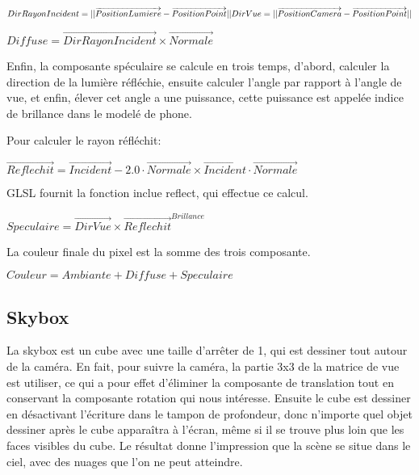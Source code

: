 \documentclass[11pt, a4paper, titlepage]{article}
\begin{document}
\begin{math}
DirRayonIncident = ||\overrightarrow{PositionLumiere} -  \overrightarrow{PositionPoint}||\\
DirVue = ||\overrightarrow{PositionCamera} -  \overrightarrow{PositionPoint}||
\end{math}

\begin{math}
Diffuse = \overrightarrow{DirRayonIncident} \times  \overrightarrow{Normale}
\end{math}

Enfin, la composante spéculaire se calcule en trois temps, d'abord, calculer
la direction de la lumière réfléchie, ensuite calculer l'angle par rapport à 
l'angle de vue, et enfin, élever cet angle a une puissance, cette puissance
est appelée indice de brillance dans le modelé de phone.

Pour calculer le rayon réfléchit:

\begin{math}
\overrightarrow{Reflechit} = \overrightarrow{Incident} - 2.0 \cdot \overrightarrow{Normale} \times \overrightarrow{Incident} \cdot \overrightarrow{Normale}
\end{math}

GLSL fournit la fonction inclue reflect, qui effectue ce calcul.

\begin{math}
Speculaire = \overrightarrow{DirVue} \times  \overrightarrow{Reflechit}^{Brillance}
\end{math}

La couleur finale du pixel est la somme des trois composante.

\begin{math}
Couleur = Ambiante + Diffuse + Speculaire
\end{math}


\subsection{Skybox}

La skybox est un cube avec une taille d'arrêter de 1, qui est dessiner tout autour de la caméra.
En fait, pour suivre la caméra, la partie 3x3 de la matrice de vue est utiliser, ce qui a pour effet d'éliminer la composante de translation
tout en conservant la composante rotation qui nous intéresse.
Ensuite le cube est dessiner en désactivant l'écriture dans le tampon de profondeur, donc n'importe quel objet
dessiner après le cube apparaîtra à l'écran, même si il se trouve plus loin que les faces visibles du cube.
Le résultat donne l'impression que la scène se situe dans le ciel, avec des nuages que l'on ne peut atteindre.
\end{document}
